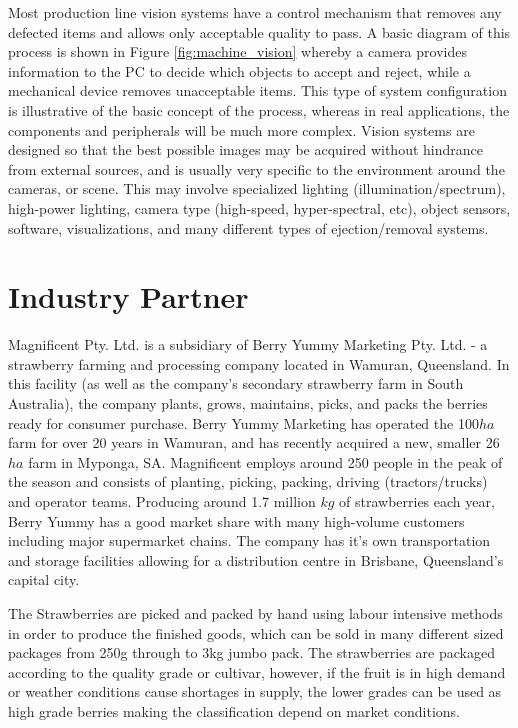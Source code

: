 \documentclass[fleqn,twoside,12pt]{report}
\begin{document}
Most production line vision systems have a control mechanism that removes any defected items and allows only acceptable quality to pass. A basic diagram of this process is shown in Figure \ref{fig:machine_vision} whereby a camera provides information to the PC to decide which objects to accept and reject, while a mechanical device removes unacceptable items. This type of system configuration is illustrative of the basic concept of the process, whereas in real applications, the components and peripherals will be much more complex. Vision systems are designed so that the best possible images may be acquired without hindrance from external sources, and is usually very specific to the environment around the cameras, or scene. This may involve specialized lighting (illumination/spectrum), high-power lighting, camera type (high-speed, hyper-spectral, etc), object sensors, software, visualizations, and many different types of ejection/removal systems.



\section{Industry Partner}

Magnificent Pty. Ltd. is a subsidiary of Berry Yummy Marketing Pty. Ltd. - a strawberry farming and processing company located in Wamuran, Queensland. In this facility (as well as the company's secondary strawberry farm in South Australia), the company plants, grows, maintains, picks, and packs the berries ready for consumer purchase. Berry Yummy Marketing has operated the 100$ha$ farm for over 20 years in Wamuran, and has recently acquired a new, smaller 26$ha$ farm in Myponga, SA. Magnificent employs around 250 people in the peak of the season and consists of planting, picking, packing, driving (tractors/trucks) and operator teams. Producing around 1.7 million $kg$ of strawberries each year, Berry Yummy has a good market share with many high-volume customers including major supermarket chains. The company has it's own transportation and storage facilities allowing for a distribution centre in Brisbane, Queensland's capital city. 

The Strawberries are picked and packed by hand using labour intensive methods in order to produce the finished goods, which can be sold in many different sized packages from 250g through to 3kg jumbo pack. The strawberries are packaged according to the quality grade or cultivar, however, if the fruit is in high demand or weather conditions cause shortages in supply, the lower grades can be used as high grade berries making the classification depend on market conditions.
\end{document}
